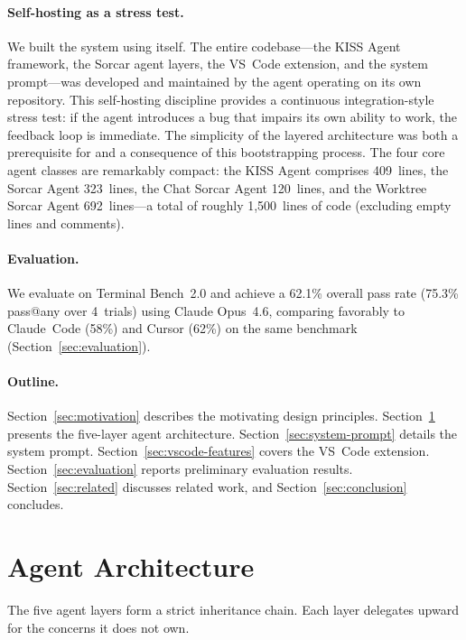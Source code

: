 \documentclass{article}
\begin{document}
\paragraph{Self-hosting as a stress test.}
We built the system using itself.  The entire codebase---the KISS
Agent framework, the Sorcar agent layers, the VS~Code extension, and
the system prompt---was developed and maintained by the agent operating
on its own repository.  This self-hosting discipline provides a
continuous integration-style stress test: if the agent introduces a
bug that impairs its own ability to work, the feedback loop is
immediate.  The simplicity of the layered architecture was both a
prerequisite for and a consequence of this bootstrapping process.
The four core agent classes are remarkably compact: the KISS Agent
comprises 409~lines, the Sorcar Agent 323~lines, the Chat Sorcar
Agent 120~lines, and the Worktree Sorcar Agent 692~lines---a total
of roughly 1,500~lines of code (excluding empty lines and comments).

\paragraph{Evaluation.}
We evaluate on Terminal Bench~2.0 and achieve a 62.1\% overall pass
rate (75.3\% pass@any over 4~trials) using Claude Opus~4.6, comparing
favorably to Claude~Code (58\%) and Cursor (62\%) on the same
benchmark (Section~\ref{sec:evaluation}).

\paragraph{Outline.}
Section~\ref{sec:motivation} describes the motivating design
principles.  Section~\ref{sec:architecture} presents the five-layer
agent architecture.  Section~\ref{sec:system-prompt} details the
system prompt.  Section~\ref{sec:vscode-features} covers the VS~Code
extension.  Section~\ref{sec:evaluation} reports preliminary
evaluation results.  Section~\ref{sec:related} discusses related work,
and Section~\ref{sec:conclusion} concludes.

\section{Agent Architecture}
\label{sec:architecture}

The five agent layers form a strict inheritance chain.  Each layer
delegates upward for the concerns it does not own.
\end{document}
